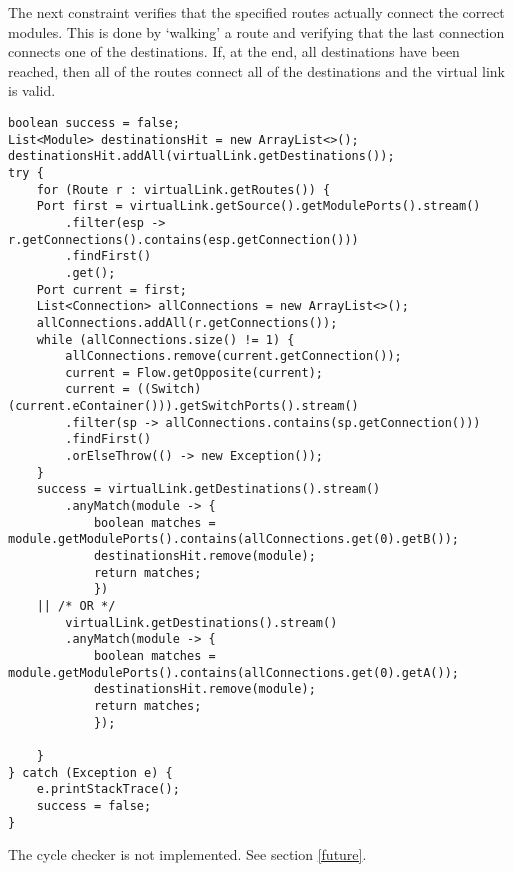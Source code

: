 The next constraint verifies that the specified routes actually connect the correct modules.
This is done by `walking' a route and verifying that the last connection
connects one of the destinations. If, at the end, all destinations have been reached,
then all of the routes connect all of the destinations and the virtual link is valid.
\begin{verbatim}
boolean success = false;
List<Module> destinationsHit = new ArrayList<>();
destinationsHit.addAll(virtualLink.getDestinations());
try {
    for (Route r : virtualLink.getRoutes()) {
    Port first = virtualLink.getSource().getModulePorts().stream()
        .filter(esp -> r.getConnections().contains(esp.getConnection()))
        .findFirst()
        .get();
    Port current = first;
    List<Connection> allConnections = new ArrayList<>();
    allConnections.addAll(r.getConnections());
    while (allConnections.size() != 1) {
        allConnections.remove(current.getConnection());
        current = Flow.getOpposite(current);
        current = ((Switch) (current.eContainer())).getSwitchPorts().stream()
        .filter(sp -> allConnections.contains(sp.getConnection()))
        .findFirst()
        .orElseThrow(() -> new Exception());
    }
    success = virtualLink.getDestinations().stream()
        .anyMatch(module -> {
            boolean matches = module.getModulePorts().contains(allConnections.get(0).getB());
            destinationsHit.remove(module);
            return matches;
            })
    || /* OR */
        virtualLink.getDestinations().stream()
        .anyMatch(module -> {
            boolean matches = module.getModulePorts().contains(allConnections.get(0).getA());
            destinationsHit.remove(module);
            return matches;
            });

    }
} catch (Exception e) {
    e.printStackTrace();
    success = false;
}
\end{verbatim}
The cycle checker is not implemented. See section \ref{future}.
